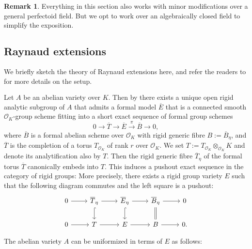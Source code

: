 \documentclass[10pt,oneside]{amsart}
\theoremstyle{definition}
\newtheorem{remark}[theorem]{Remark}
\begin{document}
	
	\begin{remark}\label{Remark on dealing with general perfectoid fields by Galois descent}
		Everything in this section also works with minor modifications over a general perfectoid field. But we opt to work over an algebraically closed field to simplify the exposition.
	\end{remark}
	
	
	\subsection{Raynaud extensions}
	
        We briefly sketch the theory of Raynaud extensions here, and refer the readers to \cite{Bosch-Lut,BL, Lut-survey, Lut} for more details on the setup.

	Let $A$ be an abelian variety over $K$. Then by \cite[Theorem~1.1]{BL} there exists a unique open rigid analytic subgroup of $A$ that admits a formal model $\overline E$ that is a connected smooth $\mathcal O_K$-group scheme fitting into a short exact sequence of formal group schemes
	\begin{equation}\label{formal Raynaud extension}
	0\rightarrow \overline T \rightarrow \overline E \xrightarrow{\pi} \overline{B}\rightarrow 0,
	\end{equation}
	where $\overline{B}$ is a formal abelian scheme over $\mathcal O_K$ with rigid generic fibre $B:=\overline{B}_\eta$, and $\overline{T}$ is the completion of a torus $T_{\mathcal O_K}$ of rank $r$ over $\mathcal O_K$.
	We set $T:=T_{\mathcal O_K}\otimes_{\mathcal O_K}K$ and denote its analytification also by $T$. Then the rigid generic fibre $\overline{T}_\eta$ of the formal torus $\overline{T}$ canonically embeds into $T$. This induces a pushout exact sequence in the category of rigid groups: More precisely, there exists a rigid group variety $E$ such that the following diagram commutes and the left square is a pushout:
		\begin{equation}\label{Raynaud diagram}
		\begin{tikzcd}
			0 \arrow[r] & \overline{T}_\eta \arrow[d, hook] \arrow[r] & \overline{E}_\eta \arrow[d, hook] \arrow[r] & \overline{B}_\eta \arrow[d,equal] \arrow[r] & 0 \\
			0 \arrow[r] & T \arrow[r] & E \arrow[r] & B \arrow[r] & 0.
		\end{tikzcd}
		\end{equation}
	
	The abelian variety $A$ can be uniformized in terms of $E$ as follows:
	
\end{document}
